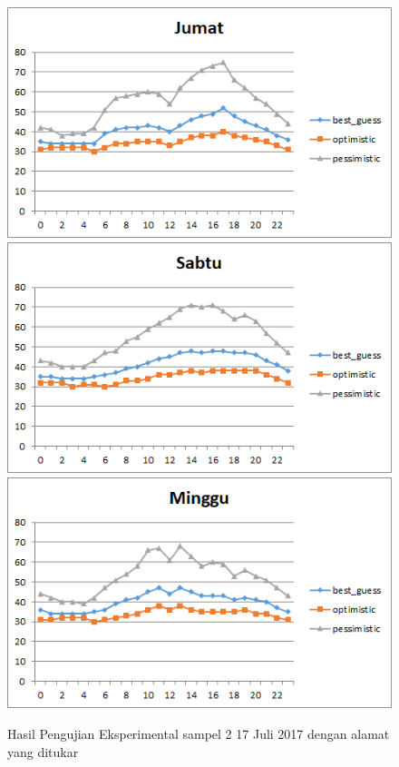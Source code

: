 \begin{figure}[H]
				\centering		
				\includegraphics[]{Gambar/jumatsampel217072017reverse.png}
				\includegraphics[]{Gambar/sabtusampel217072017reverse.png}
				\includegraphics[]{Gambar/minggusampel217072017reverse.png}
				\caption[Hasil Pengujian Eksperimental]{Hasil Pengujian Eksperimental sampel 2 17 Juli 2017 dengan alamat yang ditukar}
				\label{fig:eksperimentalsampel217072017reverse}
\end{figure}

